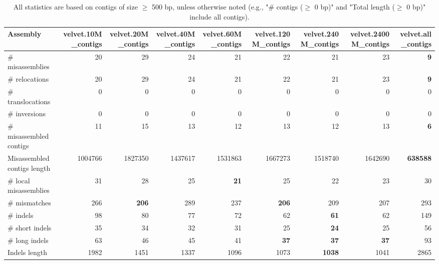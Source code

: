 \documentclass[12pt,a4paper]{article}
\begin{document}
\begin{table}[ht]
\begin{center}
\caption{All statistics are based on contigs of size $\geq$ 500 bp, unless otherwise noted (e.g., "\# contigs ($\geq$ 0 bp)" and "Total length ($\geq$ 0 bp)" include all contigs).}
\begin{tabular}{|l*{8}{|r}|}
\hline
Assembly & velvet.10M\_contigs & velvet.20M\_contigs & velvet.40M\_contigs & velvet.60M\_contigs & velvet.120M\_contigs & velvet.240M\_contigs & velvet.2400M\_contigs & velvet.all\_contigs \\ \hline
\# misassemblies & 20 & 29 & 24 & 21 & 22 & 21 & 23 & {\bf 9} \\ \hline
\hspace{5mm}\# relocations & 20 & 29 & 24 & 21 & 22 & 21 & 23 & {\bf 9} \\ \hline
\hspace{5mm}\# translocations & 0 & 0 & 0 & 0 & 0 & 0 & 0 & 0 \\ \hline
\hspace{5mm}\# inversions & 0 & 0 & 0 & 0 & 0 & 0 & 0 & 0 \\ \hline
\# misassembled contigs & 11 & 15 & 13 & 12 & 13 & 12 & 13 & {\bf 6} \\ \hline
Misassembled contigs length & 1004766 & 1827350 & 1437617 & 1531863 & 1667273 & 1518740 & 1642690 & {\bf 638588} \\ \hline
\# local misassemblies & 31 & 28 & 25 & {\bf 21} & 25 & 22 & 23 & 30 \\ \hline
\# mismatches & 266 & {\bf 206} & 289 & 237 & {\bf 206} & 209 & 207 & 293 \\ \hline
\# indels & 98 & 80 & 77 & 72 & 62 & {\bf 61} & 62 & 149 \\ \hline
\hspace{5mm}\# short indels & 35 & 34 & 32 & 31 & 25 & {\bf 24} & 25 & 56 \\ \hline
\hspace{5mm}\# long indels & 63 & 46 & 45 & 41 & {\bf 37} & {\bf 37} & {\bf 37} & 93 \\ \hline
Indels length & 1982 & 1451 & 1337 & 1096 & 1073 & {\bf 1038} & 1041 & 2865 \\ \hline
\end{tabular}
\end{center}
\end{table}
\end{document}
